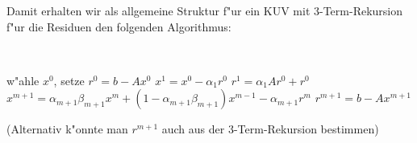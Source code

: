 Damit erhalten wir als allgemeine Struktur f"ur ein KUV mit 3-Term-Re\-kur\-sion f"ur die Residuen den folgenden Algorithmus:
\clearpage
\begin{alg} \label{3Term_alg}
~  				%
\vspace*{-2\baselineskip}	%
\begin{algorithm}
\begin{algorithmic}
\STATE w"ahle $x^0$, setze $r^0 = b -Ax^0$
\STATE $x^1 = x^0 - \alpha_1 r^0$
\STATE $r^1 = \alpha_1 A r^0 + r^0$ 
\STATE $x^{m+1}= \alpha_{m+1} \beta_{m+1} x^m + (1 - \alpha_{m+1} \beta_{m+1}) x^{m-1} - 
      \alpha_{m+1} r^m$
\STATE $r^{m+1}=b-Ax^{m+1}$ 
\ENDFOR
\end{algorithmic}
\end{algorithm}
\end{alg}

(Alternativ k"onnte man $r^{m+1}$ auch aus der 3-Term-Rekursion bestimmen)

